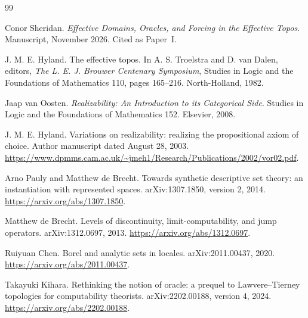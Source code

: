 \documentclass[11pt,a4paper]{article}
\numberwithin{equation}{section}
\theoremstyle{definition}
\theoremstyle{remark}
\theoremstyle{plain}
\begin{document}
\begin{thebibliography}{99}

Conor Sheridan.
\newblock \emph{Effective Domains, Oracles, and Forcing in the Effective Topos}.
\newblock Manuscript, November 2026. Cited as Paper~I.

J. M. E. Hyland.
\newblock The effective topos.
\newblock In A. S. Troelstra and D. van Dalen, editors,
\emph{The L. E. J. Brouwer Centenary Symposium}, Studies in Logic and the
Foundations of Mathematics 110, pages 165--216. North-Holland, 1982.

Jaap van Oosten.
\newblock \emph{Realizability: An Introduction to its Categorical Side}.
\newblock Studies in Logic and the Foundations of Mathematics 152.
Elsevier, 2008.

J. M. E. Hyland.
\newblock Variations on realizability: realizing the propositional axiom of choice.
\newblock Author manuscript dated August 28, 2003.
\newblock \url{https://www.dpmms.cam.ac.uk/~jmeh1/Research/Publications/2002/vor02.pdf}.

Arno Pauly and Matthew de Brecht.
\newblock Towards synthetic descriptive set theory: an instantiation with represented spaces.
\newblock arXiv:1307.1850, version 2, 2014.
\newblock \url{https://arxiv.org/abs/1307.1850}.

Matthew de Brecht.
\newblock Levels of discontinuity, limit-computability, and jump operators.
\newblock arXiv:1312.0697, 2013.
\newblock \url{https://arxiv.org/abs/1312.0697}.

Ruiyuan Chen.
\newblock Borel and analytic sets in locales.
\newblock arXiv:2011.00437, 2020.
\newblock \url{https://arxiv.org/abs/2011.00437}.

Takayuki Kihara.
\newblock Rethinking the notion of oracle: a prequel to Lawvere--Tierney topologies for computability theorists.
\newblock arXiv:2202.00188, version 4, 2024.
\newblock \url{https://arxiv.org/abs/2202.00188}.

\end{thebibliography}
\end{document}
